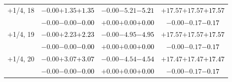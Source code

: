 \documentclass[compress]{beamer}
\begin{document}
\begin{frame}
\begin{tabular}{r | c | c | c}
$+$1/4, 18 & $-0.00$\hspace{0.1 cm}$+1.35$\hspace{0.1 cm}\textcolor{black}{$+1.35$} & $-0.00$\hspace{0.1 cm}$-5.21$\hspace{0.1 cm}\textcolor{black}{$-5.21$} & $+17.57$\hspace{0.1 cm}$+17.57$\hspace{0.1 cm}\textcolor{black}{$+17.57$} \\
           & $-0.00$\hspace{0.1 cm}$-0.00$\hspace{0.1 cm}\textcolor{black}{$-0.00$} & $+0.00$\hspace{0.1 cm}$+0.00$\hspace{0.1 cm}\textcolor{black}{$+0.00$} & $-0.00$\hspace{0.1 cm}$-0.17$\hspace{0.1 cm}\textcolor{black}{$-0.17$} \\
$+$1/4, 19 & $-0.00$\hspace{0.1 cm}$+2.23$\hspace{0.1 cm}\textcolor{black}{$+2.23$} & $-0.00$\hspace{0.1 cm}$-4.95$\hspace{0.1 cm}\textcolor{black}{$-4.95$} & $+17.57$\hspace{0.1 cm}$+17.57$\hspace{0.1 cm}\textcolor{black}{$+17.57$} \\
           & $-0.00$\hspace{0.1 cm}$-0.00$\hspace{0.1 cm}\textcolor{black}{$-0.00$} & $+0.00$\hspace{0.1 cm}$+0.00$\hspace{0.1 cm}\textcolor{black}{$+0.00$} & $-0.00$\hspace{0.1 cm}$-0.17$\hspace{0.1 cm}\textcolor{black}{$-0.17$} \\
$+$1/4, 20 & $-0.00$\hspace{0.1 cm}$+3.07$\hspace{0.1 cm}\textcolor{black}{$+3.07$} & $-0.00$\hspace{0.1 cm}$-4.54$\hspace{0.1 cm}\textcolor{black}{$-4.54$} & $+17.47$\hspace{0.1 cm}$+17.47$\hspace{0.1 cm}\textcolor{black}{$+17.47$} \\
           & $-0.00$\hspace{0.1 cm}$-0.00$\hspace{0.1 cm}\textcolor{black}{$-0.00$} & $+0.00$\hspace{0.1 cm}$+0.00$\hspace{0.1 cm}\textcolor{black}{$+0.00$} & $-0.00$\hspace{0.1 cm}$-0.17$\hspace{0.1 cm}\textcolor{black}{$-0.17$} \\

\end{tabular}
\end{frame}
\end{document}
